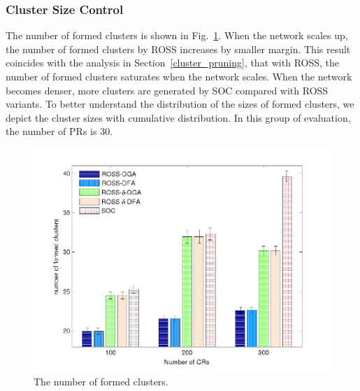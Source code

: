 \documentclass[10pt,journal,compsoc]{IEEEtran}
\theoremstyle{mytheoremstyle}
\theoremstyle{mytheoremstyle}
\theoremstyle{mytheoremstyle}
\begin{document}
\subsubsection{Cluster Size Control}

The number of formed clusters is shown in Fig.~\ref{nClusters_largeNetwork}.
When the network scales up, the number of formed clusters by ROSS increases by smaller margin.
This result coincides with the analysis in Section~\ref{cluster_pruning}, that with ROSS, the number of formed clusters saturates when the network scales.
When the network becomes denser, more clusters are generated by SOC compared with ROSS variants.
To better understand the distribution of the sizes of formed clusters, we depict the cluster sizes with cumulative distribution.
In this group of evaluation, the number of PRs is 30.

\begin{figure}[!h]
  \centering
   \includegraphics[width=1\linewidth]{nClusters_largeNetwork.pdf}
  \caption{The number of formed clusters.}
  \label{nClusters_largeNetwork}
\end{figure}





\end{document}
